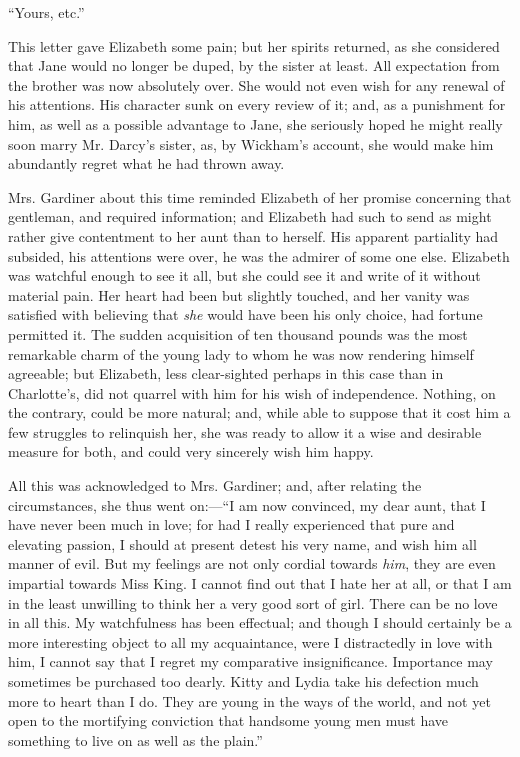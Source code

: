 ``Yours, etc.''

This letter gave Elizabeth some pain; but her spirits returned, as she considered that Jane would no longer be duped, by the sister at least. All expectation from the brother was now absolutely over. She would not even wish for any renewal of his attentions. His character sunk on every review of it; and, as a punishment for him, as well as a possible advantage to Jane, she seriously hoped he might really soon marry Mr. Darcy's sister, as, by Wickham's account, she would make him abundantly regret what he had thrown away.

Mrs. Gardiner about this time reminded Elizabeth of her promise concerning that gentleman, and required information; and Elizabeth had such to send as might rather give contentment to her aunt than to herself. His apparent partiality had subsided, his attentions were over, he was the admirer of some one else. Elizabeth was watchful enough to see it all, but she could see it and write of it without material pain. Her heart had been but slightly touched, and her vanity was satisfied with believing that \textit{she} would have been his only choice, had fortune permitted it. The sudden acquisition of ten thousand pounds was the most remarkable charm of the young lady to whom he was now rendering himself agreeable; but Elizabeth, less clear-sighted perhaps in this case than in Charlotte's, did not quarrel with him for his wish of independence. Nothing, on the contrary, could be more natural; and, while able to suppose that it cost him a few struggles to relinquish her, she was ready to allow it a wise and desirable measure for both, and could very sincerely wish him happy.

All this was acknowledged to Mrs. Gardiner; and, after relating the circumstances, she thus went on:---``I am now convinced, my dear aunt, that I have never been much in love; for had I really experienced that pure and elevating passion, I should at present detest his very name, and wish him all manner of evil. But my feelings are not only cordial towards \textit{him}, they are even impartial towards Miss King. I cannot find out that I hate her at all, or that I am in the least unwilling to think her a very good sort of girl. There can be no love in all this. My watchfulness has been effectual; and though I should certainly be a more interesting object to all my acquaintance, were I distractedly in love with him, I cannot say that I regret my comparative insignificance. Importance may sometimes be purchased too dearly. Kitty and Lydia take his defection much more to heart than I do. They are young in the ways of the world, and not yet open to the mortifying conviction that handsome young men must have something to live on as well as the plain.''



